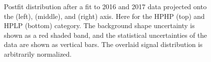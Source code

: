 \begin{figure}[h!]
\caption{Postfit distribution after a fit to 2016 and 2017 data projected onto the \MJO (left), \MJT (middle), and \MVV (right) axis. Here for the HPHP (top) and HPLP (bottom) category. The background shape uncertainty is shown as a red shaded band,  and the statistical uncertainties of the data are shown as vertical bars. The overlaid signal distribution is arbitrarily normalized.}
\label{fig:searchIII:finalPostFit}
\end{figure}
